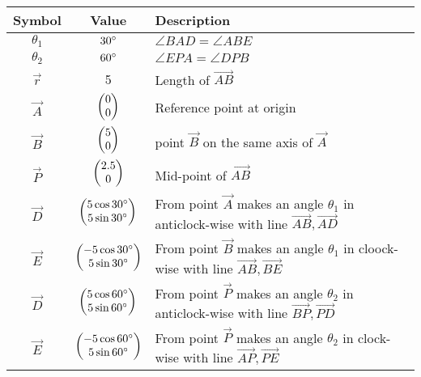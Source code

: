 \begin{tabular}{|c|c|p{5cm}|}
\hline
\textbf{Symbol} & \textbf{Value} & \textbf{Description} \\
\hline
$\theta_1$ & $30\degree$ & $\angle{BAD} = \angle{ABE}$ \\
\hline
$\theta_2$ & $60\degree$ & $\angle{EPA} = \angle{DPB}$ \\
\hline
	$\vec{r}$ & 5 & Length of $\vec{AB}$ \\
\hline
	$\vec{A}$ & $\begin{pmatrix}0\\0\end{pmatrix}$ & Reference point at origin \\
\hline
	$\vec{B}$ & $\begin{pmatrix}5\\0\end{pmatrix}$ & point $\vec{B}$ on the same axis of $\vec{A}$ \\
\hline
	$\vec{P}$ & $\begin{pmatrix}2.5\\0\end{pmatrix}$ & Mid-point of $\vec{AB}$ \\
\hline
	$\vec{D}$ & $\begin{pmatrix}5 \cos 30\degree  \\ 5 \sin 30\degree\end{pmatrix}$ & From point $\vec{A}$ makes an angle $\theta_1$ in anticlock-wise with line $\vec{AB},\vec{AD}$  \\
\hline
$\vec{E}$ & $\begin{pmatrix}-5 \cos 30\degree  \\ 5 \sin 30\degree\end{pmatrix}$ & From point $\vec{B}$ makes an angle $\theta_1$ in cloock-wise with line $\vec{AB},\vec{BE}$  \\
\hline 
$\vec{D}$ & $\begin{pmatrix}5 \cos 60\degree  \\ 5 \sin 60\degree\end{pmatrix}$ & From point $\vec{P}$ makes an angle $\theta_2$ in anticlock-wise with line $\vec{BP},\vec{PD}$  \\
\hline
$\vec{E}$ & $\begin{pmatrix}-5 \cos 60\degree  \\ 5 \sin 60\degree\end{pmatrix}$ & From point $\vec{P}$ makes an angle $\theta_2$ in clock-wise with line $\vec{AP},\vec{PE}$  \\
\hline

\end{tabular}
